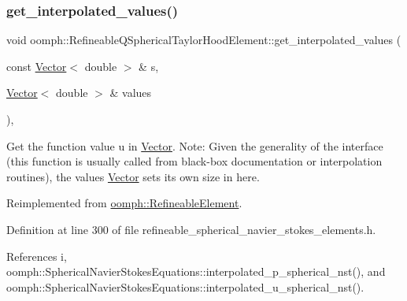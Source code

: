 \subsubsection{\texorpdfstring{get\+\_\+interpolated\+\_\+values()}{get\_interpolated\_values()}\hspace{0.1cm}{\footnotesize\ttfamily [1/2]}}
{\footnotesize\ttfamily void oomph\+::\+Refineable\+Q\+Spherical\+Taylor\+Hood\+Element\+::get\+\_\+interpolated\+\_\+values (\begin{DoxyParamCaption}\item[{const \hyperlink{classoomph_1_1Vector}{Vector}$<$ double $>$ \&}]{s,  }\item[{\hyperlink{classoomph_1_1Vector}{Vector}$<$ double $>$ \&}]{values }\end{DoxyParamCaption})\hspace{0.3cm}{\ttfamily [inline]}, {\ttfamily [virtual]}}



Get the function value u in \hyperlink{classoomph_1_1Vector}{Vector}. Note\+: Given the generality of the interface (this function is usually called from black-\/box documentation or interpolation routines), the values \hyperlink{classoomph_1_1Vector}{Vector} sets its own size in here. 



Reimplemented from \hyperlink{classoomph_1_1RefineableElement_ad9a4f92880668a2373326d8306365c43}{oomph\+::\+Refineable\+Element}.



Definition at line 300 of file refineable\+\_\+spherical\+\_\+navier\+\_\+stokes\+\_\+elements.\+h.



References i, oomph\+::\+Spherical\+Navier\+Stokes\+Equations\+::interpolated\+\_\+p\+\_\+spherical\+\_\+nst(), and oomph\+::\+Spherical\+Navier\+Stokes\+Equations\+::interpolated\+\_\+u\+\_\+spherical\+\_\+nst().

\mbox{\label{classoomph_1_1RefineableQSphericalTaylorHoodElement_a3ba40964e7d5153a3b5074ff215fe116}} 
